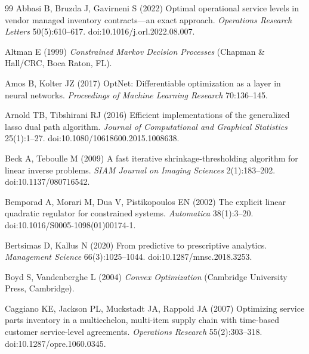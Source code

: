 \documentclass[11pt,letterpaper]{article}
\theoremstyle{definition}
\newcommand{\1}{\mathbf 1}
\begin{document}
\begin{thebibliography}{99}
Abbasi B, Bruzda J, Gavirneni S (2022) Optimal operational service levels in vendor managed inventory contracts---an exact approach. \emph{Operations Research Letters} 50(5):610--617. doi:10.1016/j.orl.2022.08.007.

Altman E (1999) \emph{Constrained Markov Decision Processes} (Chapman \& Hall/CRC, Boca Raton, FL).

Amos B, Kolter JZ (2017) OptNet: Differentiable optimization as a layer in neural networks. \emph{Proceedings of Machine Learning Research} 70:136--145.

Arnold TB, Tibshirani RJ (2016) Efficient implementations of the generalized lasso dual path algorithm. \emph{Journal of Computational and Graphical Statistics} 25(1):1--27. doi:10.1080/10618600.2015.1008638.

Beck A, Teboulle M (2009) A fast iterative shrinkage-thresholding algorithm for linear inverse problems. \emph{SIAM Journal on Imaging Sciences} 2(1):183--202. doi:10.1137/080716542.

Bemporad A, Morari M, Dua V, Pistikopoulos EN (2002) The explicit linear quadratic regulator for constrained systems. \emph{Automatica} 38(1):3--20. doi:10.1016/S0005-1098(01)00174-1.

Bertsimas D, Kallus N (2020) From predictive to prescriptive analytics. \emph{Management Science} 66(3):1025--1044. doi:10.1287/mnsc.2018.3253.

Boyd S, Vandenberghe L (2004) \emph{Convex Optimization} (Cambridge University Press, Cambridge).

Caggiano KE, Jackson PL, Muckstadt JA, Rappold JA (2007) Optimizing service parts inventory in a multiechelon, multi-item supply chain with time-based customer service-level agreements. \emph{Operations Research} 55(2):303--318. doi:10.1287/opre.1060.0345.


\end{thebibliography}
\end{document}
